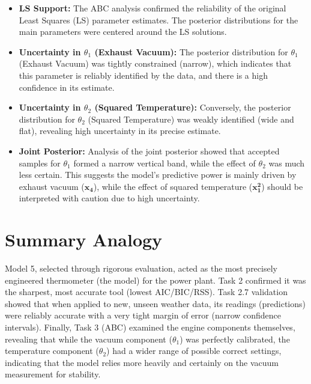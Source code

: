 \documentclass[12pt,a4paper]{article}
\begin{document}
\begin{itemize}
    \item \textbf{LS Support:} The ABC analysis confirmed the reliability of the original Least Squares (LS) parameter estimates. The posterior distributions for the main parameters were centered around the LS solutions.
    \item \textbf{Uncertainty in $\theta_1$ (Exhaust Vacuum):} The posterior distribution for $\theta_1$ (Exhaust Vacuum) was tightly constrained (narrow), which indicates that this parameter is reliably identified by the data, and there is a high confidence in its estimate.
    \item \textbf{Uncertainty in $\theta_2$ (Squared Temperature):} Conversely, the posterior distribution for $\theta_2$ (Squared Temperature) was weakly identified (wide and flat), revealing high uncertainty in its precise estimate.
    \item \textbf{Joint Posterior:} Analysis of the joint posterior showed that accepted samples for $\theta_1$ formed a narrow vertical band, while the effect of $\theta_2$ was much less certain. This suggests the model's predictive power is mainly driven by exhaust vacuum ($\mathbf{x_4}$), while the effect of squared temperature ($\mathbf{x_1^2}$) should be interpreted with caution due to high uncertainty.
\end{itemize}

\section{Summary Analogy}

Model 5, selected through rigorous evaluation, acted as the most precisely engineered thermometer (the model) for the power plant. Task 2 confirmed it was the sharpest, most accurate tool (lowest AIC/BIC/RSS). Task 2.7 validation showed that when applied to new, unseen weather data, its readings (predictions) were reliably accurate with a very tight margin of error (narrow confidence intervals). Finally, Task 3 (ABC) examined the engine components themselves, revealing that while the vacuum component ($\theta_1$) was perfectly calibrated, the temperature component ($\theta_2$) had a wider range of possible correct settings, indicating that the model relies more heavily and certainly on the vacuum measurement for stability.
\end{document}
